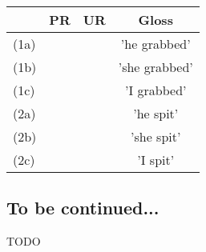 \documentclass[11pt,draft]{article}
\begin{document}
\begin{table}[htdp]
\begin{tabularx}{400pt}{|l| C | C | C|}
	\hline
	&
	PR &
	UR &
	Gloss \\\hline\hline
	
	(1a) &
	 &
	 &
	'he grabbed' \\
	
	(1b) &
	 &
	 &
	'she grabbed' \\
	
	(1c) &
	 &
	 &
	'I grabbed' \\
	\hline
	
	(2a) &
	 &
	 &
	'he spit' \\
	
	(2b) &
	 &
	 &
	'she spit' \\
	
	(2c) &
	 &
	 &
	'I spit' \\
	\hline
	
\end{tabularx}
\end{table}


\subsection{To be continued...}

TODO





%
%
%	
%




\end{document}
